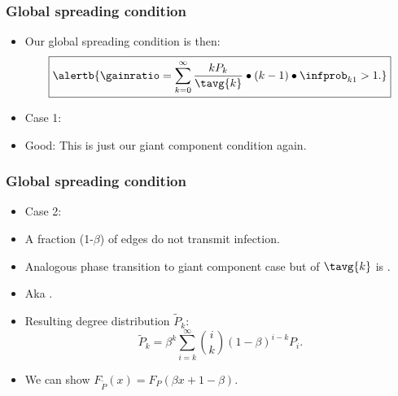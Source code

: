 \begin{frame}
  \frametitle{Global spreading condition}

  \begin{itemize}
  \item<1-> 
    Our global spreading condition is then:
    $$
    \boxed{
      \alertb{
        \gainratio
        =
        \sum_{k=0}^{\infty}
        \frac{kP_k}{\tavg{k}}
        \bullet
        (k-1)
        \bullet
        \infprob_{k1}
        > 1.
        }
      }
    $$
  \item<2->
    \alert{Case 1:}
  \item<5->
    \alert{Good:} This is just our giant component condition again.
  \end{itemize}
\end{frame}

\begin{frame}
  \frametitle{Global spreading condition}

  \begin{itemize}
  \item<1-> 
    \alert{Case 2:}
  \item<4-> 
    A fraction (1-$\beta$) of edges do not transmit 
    infection.
  \item<5-> 
    Analogous phase transition to giant component case
    but  of $\tavg{k}$ is .
  \item<6-> 
    Aka .
  \item<7-> 
    Resulting degree distribution $\tilde{P}_k$:
    $$
    \tilde{P}_k
    =
    \beta^k
    \sum_{i=k}^{\infty}
    \binom{i}{k}
    (1-\beta)^{i-k}
    P_i.
    $$
  \item<8-> 
    We can show $F_{\tilde{P}}(x) = F_{P}(\beta x + 1 - \beta)$.
  \end{itemize}

\end{frame}

